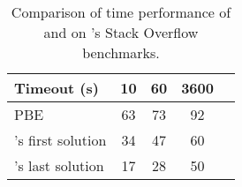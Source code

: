 \begin{table}[t]
\centering
\setlength{\tabcolsep}{2ex}
\renewcommand{\arraystretch}{1.2}
\caption{Comparison of time performance of \Regel{} and \Forest{} on \Regel{}'s Stack Overflow benchmarks.}
\begin{tabular}{@{}lcccc@{}}
\toprule
\textbf{Timeout (s)} & \textbf{10} & \textbf{60} & \textbf{3600} \\ \midrule
\Regel{} PBE               & 63 & 73 & 92 \\
\Forest{}'s first solution & 34 & 47 & 60 \\
\Forest{}'s last solution  & 17 & 28 & 50 \\ \bottomrule
\end{tabular}
\label{table:number-solved-resnax}
\end{table}
